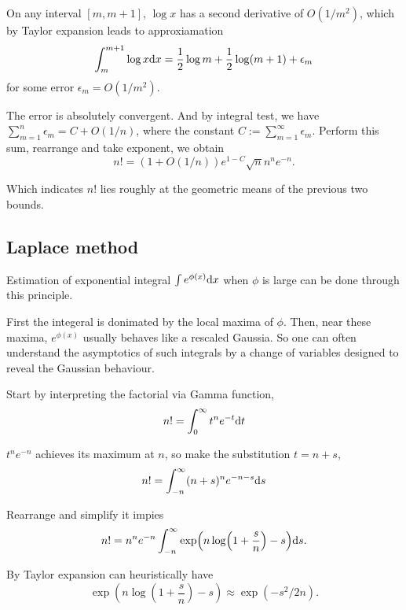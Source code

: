 On any interval $[m,m+1]$, $\log x$ has a second derivative of $O(1/m^2)$, which by Taylor expansion leads to approxiamation
\begin{equation}
    \int^{m+1}_m \log x \mathrm{d} x = \frac{1}{2} \log m + \frac{1}{2} \log (m+1) +\epsilon_m
\end{equation}
for some error $\epsilon_m=O(1/m^2)$. 

The error is absolutely convergent. And by integral test, we have $\sum_{m=1}^n \epsilon_m = C + O(1/n)$, where the constant $C := \sum_{m=1}^\infty \epsilon_m$.
 Perform this sum, rearrange and take exponent, we obtain
 \begin{equation}
     n! = (1+O(1/n))e^{1-C} \sqrt{n} n^n e^{-n}.
 \end{equation}

 Which indicates $n!$ lies roughly at the geometric means of the previous two bounds.

 \subsection{Laplace method}

 Estimation of exponential integral $\int e^{\phi(x)} \mathrm{d} x$ when $\phi$ is large can be done through this principle. 

 First the integeral is donimated by the local maxima of $\phi$. Then, near these maxima, $e^{\phi(x)}$ usually behaves like a rescaled Gaussia. 
 So one can often understand the asymptotics of such integrals by a change of variables designed to reveal the Gaussian behaviour.

 Start by interpreting the factorial via Gamma function,
 \begin{equation}
     n!=\int_{0}^{\infty} t^n e^{-t} \mathrm{d} t
 \end{equation}

 $t^ne^{-n}$ achieves its maximum at $n$, so make the substitution $t=n+s$,
 \begin{equation}
    n!=\int_{-n}^{\infty} (n+s)^n e^{-n-s} \mathrm{d} s
\end{equation}

Rearrange and simplify it impies 
\begin{equation*}
    n! = n^n e^{-n} \int_{-n}^{\infty} \exp(n\log(1+\frac{s}{n})-s)\mathrm{d} s.
\end{equation*}

By Taylor expansion can heuristically have 
\begin{equation*}
    \exp(n\log(1+\frac{s}{n})-s) \approx \exp(-s^2/2n).
\end{equation*}

